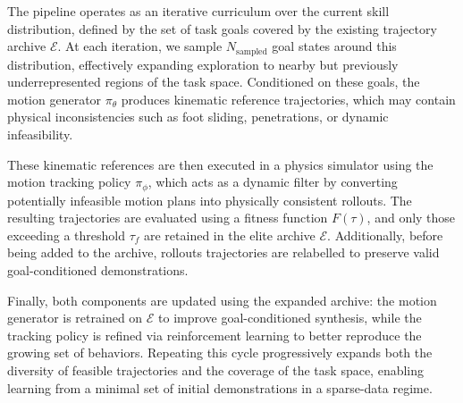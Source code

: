 \documentclass{article}
\begin{document}
The pipeline operates as an iterative curriculum over the current skill distribution, defined by the set of task goals covered by the existing trajectory archive $\mathcal{E}$. At each iteration, we sample $N_{\text{sampled}}$ goal states around this distribution, effectively expanding exploration to nearby but previously underrepresented regions of the task space. Conditioned on these goals, the motion generator $\pi_\theta$ produces kinematic reference trajectories, which may contain physical inconsistencies such as foot sliding, penetrations, or dynamic infeasibility.

These kinematic references are then executed in a physics simulator using the motion tracking policy $\pi_\phi$, which acts as a dynamic filter by converting potentially infeasible motion plans into physically consistent rollouts. The resulting trajectories are evaluated using a fitness function $F(\tau)$, and only those exceeding a threshold $\tau_f$ are retained in the elite archive $\mathcal{E}$. Additionally, before being added to the archive, rollouts trajectories are relabelled to preserve valid goal-conditioned demonstrations.

Finally, both components are updated using the expanded archive: the motion generator is retrained on $\mathcal{E}$ to improve goal-conditioned synthesis, while the tracking policy is refined via reinforcement learning to better reproduce the growing set of behaviors. Repeating this cycle progressively expands both the diversity of feasible trajectories and the coverage of the task space, enabling learning from a minimal set of initial demonstrations in a sparse-data regime.


\end{document}
